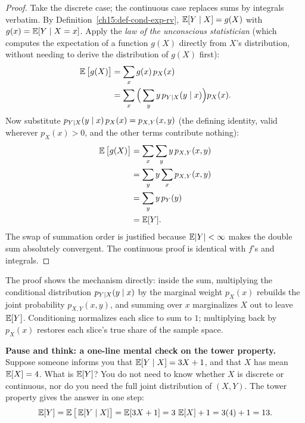 \begin{proof}
Take the discrete case; the continuous case replaces sums by integrals verbatim. By
Definition~\ref{ch15:def-cond-exp-rv}, $\operatorname{\mathbb{E}}[Y\mid X] = g(X)$ with $g(x) = \operatorname{\mathbb{E}}[Y\mid X = x]$. Apply the
\emph{law of the unconscious statistician} (which computes the expectation of a function $g(X)$ directly
from $X$'s distribution, without needing to derive the distribution of $g(X)$ first):
\begin{align*}
  \operatorname{\mathbb{E}}\big[g(X)\big] &= \sum_x g(x)\,p_X(x) \\
  &= \sum_x \Big(\sum_y y\, p_{Y\mid X}(y\mid x)\Big) p_X(x).
\end{align*}
Now substitute $p_{Y\mid X}(y\mid x)\,p_X(x) = p_{X,Y}(x,y)$ (the defining identity, valid wherever
$p_X(x)>0$, and the other terms contribute nothing):
\begin{align*}
  \operatorname{\mathbb{E}}\big[g(X)\big] &= \sum_x \sum_y y \, p_{X,Y}(x,y) \\
  &= \sum_y y \sum_x p_{X,Y}(x,y) \\
  &= \sum_y y \, p_Y(y) \\
  &= \operatorname{\mathbb{E}}[Y].
\end{align*}
The swap of summation order is justified because $\operatorname{\mathbb{E}}\lvert Y\rvert < \infty$ makes the double sum absolutely
convergent. The continuous proof is identical with $f$'s and integrals.
\end{proof}

\begin{happeningbox}
The proof shows the mechanism directly: inside the sum, multiplying the conditional
distribution $p_{Y\mid X}(y\mid x)$ by the marginal weight $p_X(x)$ rebuilds the
joint probability $p_{X,Y}(x,y)$, and summing over $x$ marginalizes $X$ out to leave
$\operatorname{\mathbb{E}}[Y]$. Conditioning normalizes each slice to sum to $1$; multiplying back by
$p_X(x)$ restores each slice's true share of the sample space.
\end{happeningbox}

\begin{recoverybox}
\textbf{Pause and think: a one-line mental check on the tower property.}
Suppose someone informs you that $\operatorname{\mathbb{E}}[Y \mid X] = 3X + 1$, and that $X$ has mean $\operatorname{\mathbb{E}}[X] = 4$. What is
$\operatorname{\mathbb{E}}[Y]$? You do not need to know whether $X$ is discrete or continuous, nor do you need the full joint
distribution of $(X, Y)$. The tower property gives the answer in one step:
\[
  \operatorname{\mathbb{E}}[Y] = \operatorname{\mathbb{E}}\big[\operatorname{\mathbb{E}}[Y \mid X]\big] = \operatorname{\mathbb{E}}[3X + 1] = 3\,\operatorname{\mathbb{E}}[X] + 1 = 3(4) + 1 = 13.
\]
\end{recoverybox}

